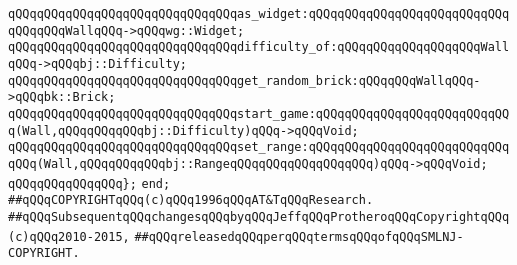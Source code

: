 \verb|qQQqqQQqqQQqqQQqqQQqqQQqqQQqqQQqas_widget:qQQqqQQqqQQqqQQqqQQqqQQqqQQqqQQqqQQqWallqQQq->qQQqwg::Widget;|\newline
\verb|qQQqqQQqqQQqqQQqqQQqqQQqqQQqqQQqdifficulty_of:qQQqqQQqqQQqqQQqqQQqWallqQQq->qQQqbj::Difficulty;|\newline
\verb|qQQqqQQqqQQqqQQqqQQqqQQqqQQqqQQqget_random_brick:qQQqqQQqWallqQQq->qQQqbk::Brick;|\newline
\newline
\verb|qQQqqQQqqQQqqQQqqQQqqQQqqQQqqQQqstart_game:qQQqqQQqqQQqqQQqqQQqqQQqqQQq(Wall,qQQqqQQqqQQqbj::Difficulty)qQQq->qQQqVoid;|\newline
\verb|qQQqqQQqqQQqqQQqqQQqqQQqqQQqqQQqset_range:qQQqqQQqqQQqqQQqqQQqqQQqqQQqqQQq(Wall,qQQqqQQqqQQqbj::RangeqQQqqQQqqQQqqQQqqQQq)qQQq->qQQqVoid;|\newline
\verb|qQQqqQQqqQQqqQQq};|\newline
\newline
\verb|end;|\newline
\newline
\verb|##qQQqCOPYRIGHTqQQq(c)qQQq1996qQQqAT&TqQQqResearch.|\newline
\verb|##qQQqSubsequentqQQqchangesqQQqbyqQQqJeffqQQqProtheroqQQqCopyrightqQQq(c)qQQq2010-2015,|\newline
\verb|##qQQqreleasedqQQqperqQQqtermsqQQqofqQQqSMLNJ-COPYRIGHT.|\newline

